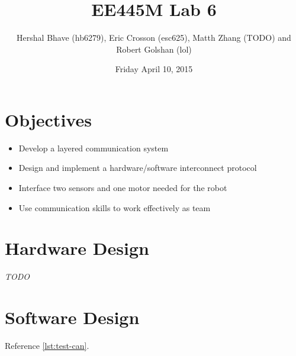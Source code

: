 \documentclass[12pt]{article}
\title{EE445M Lab 6}
\author{Hershal Bhave (hb6279), Eric Crosson (esc625), Matth Zhang
  (TODO) and Robert Golshan (lol)}
\date{Friday April 10, 2015}
\newcommand{\todo}{\hfill{\LARGE \emph{\color{red}TODO}}}
\begin{document}
\maketitle

\section{Objectives}

\begin{itemize}
\item Develop a layered communication system
\item Design and implement a hardware/software interconnect protocol
\item Interface two sensors and one motor needed for the robot
\item Use communication skills to work effectively as team
\end{itemize}

\section{Hardware Design}
\todo

\section{Software Design}
Reference \cref{lst:test-can}.
\end{document}
